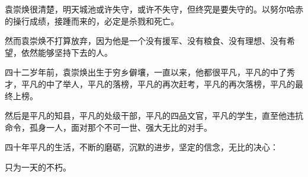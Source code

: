 \begin{multicols}{\theparacolNo}
袁崇焕很清楚，明天城池或许失守，或许不失守，但终究是要失守的。以努尔哈赤的操行成绩，接踵而来的，必定是杀戮和死亡。

然而袁崇焕不打算放弃，因为他是一个没有援军、没有粮食、没有理想、没有希望，依然能够坚持下去的人。

四十二岁年前，袁崇焕出生于穷乡僻壤，一直以来，他都很平凡，平凡的中了秀才，平凡的中了举人，平凡的落榜，平凡的再次赶考，平凡的再次落榜，平凡的最终上榜。

然后是平凡的知县，平凡的处级干部，平凡的四品文官，平凡的学生，直至他违抗命令，孤身一人，面对那个不可一世、强大无比的对手。

四十年平凡的生活，不断的磨砺，沉默的进步，坚定的信念，无比的决心：

只为一天的不朽。

\ifnum{}
	\end{multicols}
\fi
\newpage
